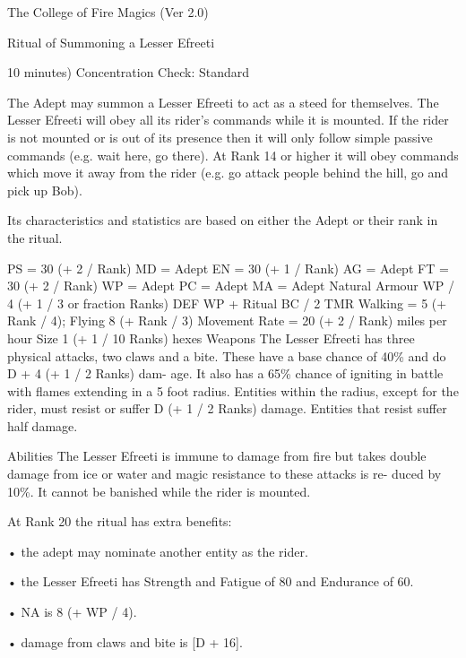 \begin{Chapter}{The College of Fire Magics (Ver 2.0)}
\begin{ritual}[R-3]{Ritual of Summoning a Lesser Efreeti}

10 minutes) 
Concentration Check: Standard 
\begin{effects}
 The  Adept  may  summon  a  Lesser  Efreeti 
to act as a steed for themselves. The Lesser Efreeti 
will  obey  all  its  rider’s  commands  while  it  is 
mounted. If the rider is not mounted or is out of its 
presence  then  it  will  only  follow  simple  passive 
commands (e.g. wait here, go there). At Rank 14 or 
higher it will obey commands which move it away 
from the rider (e.g. go attack people behind the hill, 
go and pick up Bob). 

Its characteristics and statistics are based on either 
the Adept or their rank in the ritual. 

PS = 30 (+ 2 / Rank)  MD = Adept 
EN = 30 (+ 1 / Rank)  AG = Adept 
FT = 30 (+ 2 / Rank)  WP = Adept 
PC = Adept 
MA = Adept 
Natural Armour WP / 4 (+ 1 / 3 or fraction 
Ranks) 
DEF WP + Ritual BC / 2 
TMR Walking = 5 (+ Rank / 4); Flying 8 (+ Rank / 
3) 
Movement Rate = 20 (+ 2 / Rank) miles per hour 
Size 1 (+ 1 / 10 Ranks) hexes 
Weapons  The  Lesser  Efreeti  has  three  physical 
attacks,  two  claws  and  a  bite.  These  have  a  base 
chance of 40\% and do D + 4 (+ 1 / 2 Ranks) dam-
age.  It  also  has  a  65\%  chance  of  igniting  in  battle 
with  flames  extending  in  a  5  foot  radius.  Entities 
within  the  radius,  except  for  the  rider,  must  resist 
or  suffer  D  (+  1  /  2  Ranks)  damage.  Entities  that 
resist suffer half damage. 

Abilities  The  Lesser  Efreeti  is immune  to  damage 
from  fire  but  takes  double  damage  from  ice  or 
water  and  magic  resistance  to  these  attacks  is  re-
duced  by  10\%.  It  cannot  be  banished  while  the 
rider is mounted. 

At Rank 20 the ritual has extra benefits:  

•  the  adept  may  nominate  another  entity  as  the 
rider.  

• the Lesser Efreeti has Strength and Fatigue of 80 
and Endurance of 60.  

• NA is 8 (+ WP / 4).  

• damage from claws and bite is [D + 16].  


\end{effects}
\end{ritual}
\end{Chapter}
